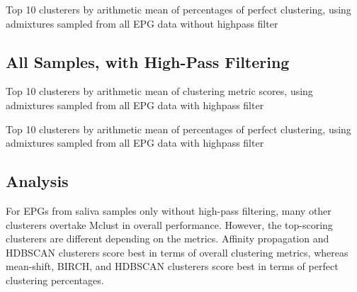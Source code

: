\begin{table}[htbp]
\centering
{}
\caption{Top 10 clusterers by arithmetic mean of percentages of perfect clustering, using admixtures sampled from all EPG data without highpass filter}
\label{table:top_10_not_ensemble_clusterers_by_binomial_confidence_highpass_0-sampleids_all-nruns_1000}
\end{table}

\FloatBarrier
\subsection{All Samples, with High-Pass Filtering}

\begin{table}[htbp]
\centering
{}
\caption{Top 10 clusterers by arithmetic mean of clustering metric scores, using admixtures sampled from all EPG data with highpass filter}
\label{table:top_10_not_ensemble_clusterers_by_metrics_highpass_71-sampleids_all-nruns_1000}
\end{table}

\begin{table}[htbp]
\centering
{}
\caption{Top 10 clusterers by arithmetic mean of percentages of perfect clustering, using admixtures sampled from all EPG data with highpass filter}
\label{table:top_10_not_ensemble_clusterers_by_binomial_confidence_highpass_71-sampleids_all-nruns_1000}
\end{table}

\FloatBarrier
\subsection{Analysis}

For EPGs from saliva samples only without high-pass filtering, many other clusterers overtake Mclust in overall performance. However, the top-scoring clusterers are different depending on the metrics. Affinity propagation and HDBSCAN clusterers score best in terms of overall clustering metrics, whereas mean-shift, BIRCH, and HDBSCAN clusterers score best in terms of perfect clustering percentages. 

